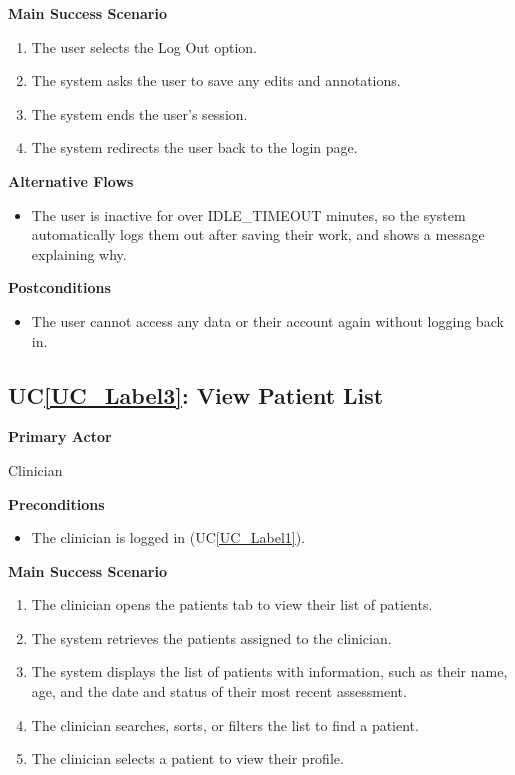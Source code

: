 \documentclass[12pt]{article}
\newcounter{ucnum} %
\newcommand{\ucref}[1]{UC\ref{#1}}
\begin{document}
\textbf{Main Success Scenario}
\begin{enumerate}
\item The user selects the Log Out option.
\item The system asks the user to save any edits and annotations.
\item The system ends the user's session.
\item The system redirects the user back to the login page.
\end{enumerate}

\textbf{Alternative Flows}
\begin{itemize}
\item[1a.] The user is inactive for over IDLE\_TIMEOUT minutes, so the system 
  automatically logs them out after saving their work, and shows a 
  message explaining why.
\end{itemize}

\textbf{Postconditions}
\begin{itemize}
\item The user cannot access any data or their account again
  without logging back in.
\end{itemize}

 \label{UC_Label3}
\subsection{\ucref{UC_Label3}: View Patient List}

\textbf{Primary Actor}

Clinician

\textbf{Preconditions}
\begin{itemize}
\item The clinician is logged in (\ucref{UC_Label1}).
\end{itemize}

\textbf{Main Success Scenario}
\begin{enumerate}
\item The clinician opens the patients tab to view their list of patients.
\item The system retrieves the patients assigned to the clinician.
\item The system displays the list of patients with information, such as their name,
  age, and the date and status of their most recent assessment.
\item The clinician searches, sorts, or filters the list to find a patient.
\item The clinician selects a patient to view their profile.
\end{enumerate}
\end{document}
